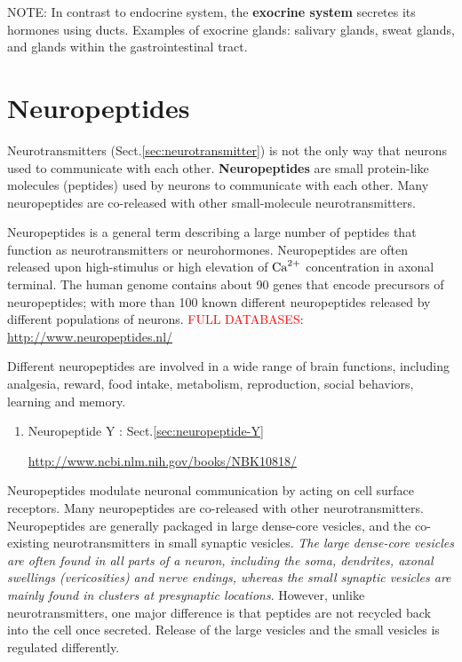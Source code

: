\begin{mdframed}

NOTE: In contrast to endocrine system, the {\bf exocrine system} secretes
its hormones using ducts.
Examples of exocrine glands:  salivary glands, sweat glands, and glands within
the gastrointestinal tract.


\end{mdframed}


\section{Neuropeptides}
\label{sec:neuropeptides}

Neurotransmitters (Sect.\ref{sec:neurotransmitter}) is not the only way that
neurons used to communicate with each other. {\bf Neuropeptides} are small
protein-like molecules (peptides) used by neurons to communicate with each
other. Many neuropeptides are co-released with other small-molecule
neurotransmitters. 


Neuropeptides is a general term describing a large number of peptides that
function as neurotransmitters or neurohormones. Neuropeptides are often released
upon high-stimulus or high elevation of ${\text{Ca}^{2+}}$ concentration in axonal terminal.
The human genome contains about 90 genes that encode precursors of
neuropeptides; with more than 100 known different neuropeptides released by
different populations of neurons.
\textcolor{red}{FULL DATABASES}: \url{http://www.neuropeptides.nl/}

Different neuropeptides are involved in a wide range of brain functions,
including analgesia, reward, food intake, metabolism, reproduction, social
behaviors, learning and memory.

\begin{enumerate}
  \item Neuropeptide Y : Sect.\ref{sec:neuropeptide-Y}

\url{http://www.ncbi.nlm.nih.gov/books/NBK10818/}
\end{enumerate}


Neuropeptides modulate neuronal communication by acting on cell surface
receptors. Many neuropeptides are co-released with other neurotransmitters.
Neuropeptides are generally packaged in large dense-core vesicles, and the
co-existing neurotransmitters in small synaptic vesicles.
{\it The large dense-core vesicles are often found in all parts of a neuron,
including the soma, dendrites, axonal swellings (vericosities) and nerve
endings, whereas the small synaptic vesicles are mainly found in clusters at
presynaptic locations}. However, unlike neurotransmitters, one major difference
is that peptides are not
recycled back into the cell once secreted. Release of the large vesicles and the
small vesicles is regulated differently.

